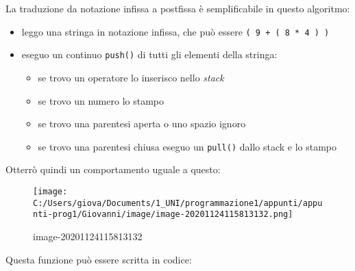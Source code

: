 \documentclass[
]{article}
\begin{document}
La traduzione da notazione infissa a postfissa è semplificabile in
questo algoritmo:

\begin{itemize}
\item
  leggo una stringa in notazione infissa, che può essere
  \texttt{(\ 9\ +\ (\ 8\ *\ 4\ )\ )}
\item
  eseguo un continuo \texttt{push()} di tutti gli elementi della
  stringa:

  \begin{itemize}
  \item
    se trovo un operatore lo inserisco nello \emph{stack}
  \item
    se trovo un numero lo stampo
  \item
    se trovo una parentesi aperta o uno spazio ignoro
  \item
    se trovo una parentesi chiusa eseguo un \texttt{pull()} dallo stack
    e lo stampo
  \end{itemize}
\end{itemize}

Otterrò quindi un comportamento uguale a questo:

\begin{figure}
\centering
\texttt{[image: C:/Users/giova/Documents/1\_UNI/programmazione1/appunti/appunti-prog1/Giovanni/image/image-20201124115813132.png]}
\caption{image-20201124115813132}
\end{figure}

Questa funzione può essere scritta in codice:
\end{document}
